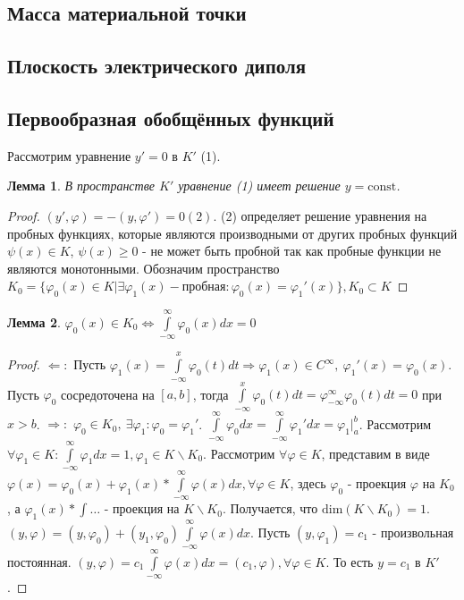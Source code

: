 \documentclass[9pt, a4paper]{article}
\newtheorem*{lemma}{Лемма}
\begin{document}
		\subsection*{Масса материальной точки}
		\subsection*{Плоскость электрического диполя}
		\subsection*{Первообразная обобщённых функций}
			Рассмотрим уравнение $y' = 0$ в $K'$ (1).
			\begin{lemma}
				В пространстве $K'$ уравнение (1) имеет решение $y = \mathrm{const}$.
			\end{lemma}
			\begin{proof}
				$(y', \varphi) = -(y, \varphi') =0 (2)$. (2) определяет решение уравнения на пробных функциях, которые являются производными от других пробных функций $\psi(x) \in K$, $\psi(x) \geq 0$ - не может быть пробной так как пробные функции не являются монотонными. Обозначим пространство $K_0 = \{\varphi_0(x) \in K \vert \exists \varphi_1(x) - \text{пробная}: \varphi_0(x) = \varphi_1'(x)\}, K_0\subset K$
			\end{proof}
			\begin{lemma}
				$\varphi_0(x) \in K_0 \Leftrightarrow \int\limits_{-\infty}^{\infty} \varphi_0(x) dx = 0$
			\end{lemma}
			\begin{proof}
				$\Leftarrow:$ Пусть $\varphi_1(x) = \int\limits_{-\infty}^{x}\varphi_0(t) dt \Rightarrow \varphi_1(x) \in C^\infty, \ \varphi_1'(x) = \varphi_0(x)$. Пусть $\varphi_0$ сосредоточена на $[a,b]$, тогда $\int\limits_{-\infty}^{x}\varphi_0(t) dt = \varphi_{-\infty}^{\infty} \varphi_0(t)dt  = 0$ при $x > b$. \newline
				$\Rightarrow:$ $\varphi_0 \in K_0, \ \exists \varphi_1: \varphi_0 = \varphi_1'$. $\int\limits_{-\infty}^{\infty} \varphi_0 dx = \int\limits_{-\infty}^{\infty} \varphi_1' dx = \varphi_1 \vert_a^b$. Рассмотрим $\forall \varphi_1 \in K: \int\limits_{-\infty}^{\infty} \varphi_1 dx =1, \varphi_1 \in K \backslash K_0$. Рассмотрим $\forall \varphi \in K$, представим в виде $\varphi(x) = \varphi_0(x) + \varphi_1(x) * \int\limits_{-\infty}^{\infty} \varphi(x) dx, \forall \varphi \in K$, здесь $\varphi_0$ - проекция $\varphi$ на $K_0$, а $\varphi_1(x) * \int\dots$ - проекция на $K \backslash K_0$. Получается, что $\mathrm{dim} (K \backslash K_0) = 1$.\newline
				$(y, \varphi) = (y, \varphi_0) + (y_1, \varphi_0)\int\limits_{-\infty}^{\infty} \varphi(x) dx$. Пусть $(y, \varphi_1) = c_1$ - произвольная постоянная. $(y, \varphi) = c_1 \int\limits_{-\infty}^{\infty} \varphi(x) dx = (c_1, \varphi), \forall \varphi \in K$. То есть $y = c_1$ в $K'$. 
			\end{proof}
\end{document}
